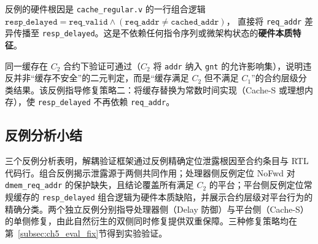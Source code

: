 反例的硬件根因是 \texttt{cache\_regular.v} 的一行组合逻辑
$\texttt{resp\_delayed} = \texttt{req\_valid} \land (\texttt{req\_addr} \neq \texttt{cached\_addr})$，
直接将 \texttt{req\_addr} 差异传播至 \texttt{resp\_delayed}。这是不依赖任何指令序列或微架构状态的\textbf{硬件本质特征}。

同一缓存在 $C_2$ 合约下验证可通过（$C_2$ 将 \texttt{addr} 纳入 \texttt{gnt} 的允许影响集），说明违反并非``缓存不安全''的二元判定，而是``缓存满足 $C_2$ 但不满足 $C_1$''的合约层级分类结果。该反例指导修复策略二：将缓存替换为常数时间实现（Cache-S 或理想内存），使 \texttt{resp\_delayed} 不再依赖 \texttt{req\_addr}。

\subsection{反例分析小结}
\label{subsec:ch5_cex_summary}

三个反例分析表明，解耦验证框架通过反例精确定位泄露根因至合约条目与 RTL 代码行。组合反例揭示泄露源于两侧共同作用；处理器侧反例定位 NoFwd 对 \texttt{dmem\_req\_addr} 的保护缺失，且结论覆盖所有满足 $C_2$ 的平台；平台侧反例定位常规缓存的 \texttt{resp\_delayed} 组合逻辑为硬件本质缺陷，并展示合约层级对平台行为的精确分类。两个独立反例分别指导处理器侧（Delay 防御）与平台侧（Cache-S）的单侧修复，由此自然衍生的双侧同时修复提供双重保障。三种修复策略均在第~\ref{subsec:ch5_eval_fix}节得到实验验证。
